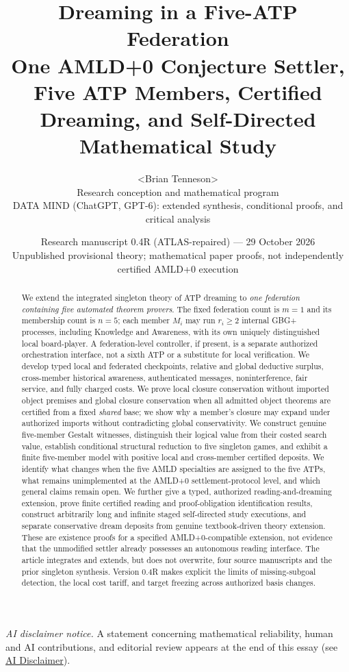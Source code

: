 \documentclass[11pt]{article}
\title{\textbf{Dreaming in a Five-ATP Federation}\\[5pt]\large One AMLD+0 Conjecture Settler, Five ATP Members, Certified Dreaming, and Self-Directed Mathematical Study}
\author{\textless{}Brian Tenneson\textgreater{}\\\small Research conception and mathematical program\\[3pt]\small DATA MIND (ChatGPT, GPT-6): extended synthesis, conditional proofs, and critical analysis}
\date{Research manuscript 0.4R (ATLAS-repaired) --- 29 October 2026\\\small Unpublished provisional theory; mathematical paper proofs, not independently certified AMLD+0 execution}
\begin{document}
\maketitle
\begin{center}
\small\emph{AI disclaimer notice.} A statement concerning mathematical reliability, human and AI contributions, and editorial review appears at the end of this essay (see \hyperref[sec:ai-disclaimer]{AI Disclaimer}).
\end{center}
\vspace{0.3em}

\setcounter{figure}{2}
\begin{abstract}
We extend the integrated singleton theory of ATP dreaming to \emph{one federation containing five automated theorem provers}. The fixed federation count is $m=1$ and its membership count is $n=5$; each member $M_i$ may run $r_i\ge2$ internal GBG+ processes, including Knowledge and Awareness, with its own uniquely distinguished local board-player. A federation-level controller, if present, is a separate authorized orchestration interface, not a sixth ATP or a substitute for local verification. We develop typed local and federated checkpoints, relative and global deductive surplus, cross-member historical awareness, authenticated messages, noninterference, fair service, and fully charged costs. We prove local closure conservation without imported object premises and global closure conservation when all admitted object theorems are certified from a fixed \emph{shared} base; we show why a member's closure may expand under authorized imports without contradicting global conservativity. We construct genuine five-member Gestalt witnesses, distinguish their logical value from their costed search value, establish conditional structural reduction to five singleton games, and exhibit a finite five-member model with positive local and cross-member certified deposits. We identify what changes when the five AMLD specialties are assigned to the five ATPs, what remains unimplemented at the AMLD+0 settlement-protocol level, and which general claims remain open. We further give a typed, authorized reading-and-dreaming extension, prove finite certified reading and proof-obligation identification results, construct arbitrarily long and infinite staged self-directed study executions, and separate conservative dream deposits from genuine textbook-driven theory extension. These are existence proofs for a specified AMLD+0-compatible extension, not evidence that the unmodified settler already possesses an autonomous reading interface. The article integrates and extends, but does not overwrite, four source manuscripts and the prior singleton synthesis. Version 0.4R makes explicit the limits of missing-subgoal detection, the local cost tariff, and target freezing across authorized basis changes.
\end{abstract}
\tableofcontents
\end{document}
